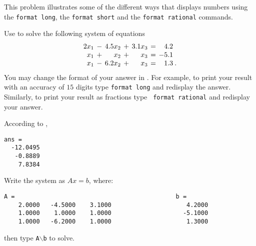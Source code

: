 \documentclass{ximera}
\begin{document}
\begin{exercise} \label{c2.1.4}
This problem illustrates some of the different ways that \Matlab
displays numbers using the {\tt format long}, the {\tt format short} and
the {\tt format rational} commands.

Use \Matlab to solve the following system of equations
\[
\arraycolsep 2pt
\begin{array}{rcrcrcrl}
 2x_1 & - & 4.5x_2 & + & 3.1x_3 & = &   4.2  & \\
  x_1 & + &  x_2 & + &  x_3 & = &  -5.1  & \\
  x_1 & - & 6.2x_2 & + &  x_3 & = &  1.3  & \! .
\end{array}
\]
You may change the format of your answer in \Matlabp.  For
example, to print your result with an accuracy of $15$ digits
type {\tt format long}  and redisplay the
answer.  Similarly, to print your result as fractions type {\tt
format rational}  and redisplay your
answer.

\begin{solution}
\ans According to \Matlabp,
\begin{verbatim}
ans =
  -12.0495
   -0.8889
    7.8384
\end{verbatim}
\soln Write the system as $Ax = b$, where:
\begin{verbatim}
A =                                             b = 
    2.0000   -4.5000    3.1000                     4.2000
    1.0000    1.0000    1.0000                    -5.1000
    1.0000   -6.2000    1.0000                     1.3000
\end{verbatim}
then type {\tt A}$\backslash${\tt b} to solve.

\end{solution}
\end{exercise}
\end{document}
